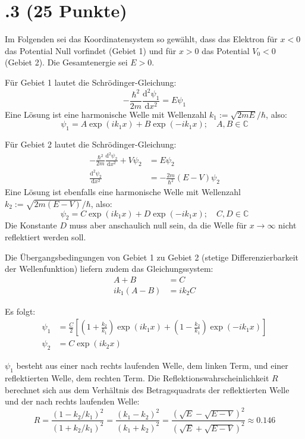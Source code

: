 \section*{\nr.3 \titthree (25 Punkte)}
Im Folgenden sei das Koordinatensystem so gewählt, dass das Elektron für $x<0$ das Potential Null vorfindet (Gebiet 1) und für $x>0$ das Potential $V_0<0$ (Gebiet 2). Die Gesamtenergie sei $E>0$.

Für Gebiet 1 lautet die Schrödinger-Gleichung:
\begin{equation}
-\frac{\hbar^2}{2m}\frac{\mathrm{d}^2 \psi_1}{\mathrm{d} x^2} = E \psi_1
\end{equation}
Eine Lösung ist eine harmonische Welle mit Wellenzahl $k_1 := \sqrt{2mE}/\hbar$, also:
\begin{equation}
\psi_1 = A\exp(ik_1 x) + B\exp(-ik_1 x); \quad A,B\in \mathbb{C}
\end{equation}

Für Gebiet 2 lautet die Schrödinger-Gleichung:
\begin{align}
-\frac{\hbar^2}{2m}\frac{\mathrm{d}^2 \psi_2}{\mathrm{d} x^2} +V\psi_2 &= E \psi_2\\
\frac{\mathrm{d}^2\psi_2}{\mathrm{d}x^2} &= -\frac{2m}{\hbar^2}(E-V) \psi_2
\end{align}
Eine Lösung ist ebenfalls eine harmonische Welle mit Wellenzahl $k_2 := \sqrt{2m(E-V)}/\hbar$, also:
\begin{equation}
\psi_2 = C\exp(ik_1 x) + D\exp(-ik_1 x); \quad C,D\in \mathbb{C}
\end{equation}
Die Konstante $D$ muss aber anschaulich null sein, da die Welle für $x\to \infty$ nicht reflektiert werden soll.

Die Übergangsbedingungen von Gebiet 1 zu Gebiet 2 (stetige Differenzierbarkeit der Wellenfunktion) liefern zudem das Gleichungssystem:
\begin{align}
A+B &= C \\
ik_1 (A-B) &= ik_2 C
\end{align}

Es folgt:
\begin{align}
\psi_1 &= \frac{C}{2} \left[ \left(1 + \frac{k_2}{k_1} \right)\exp(ik_1x) + \left(1 - \frac{k_2}{k_1} \right)\exp(-ik_1x)  \right] \\
\psi_2&= C \exp(ik_2x)
\end{align}

$\psi_1$ besteht aus einer nach rechts laufenden Welle, dem linken Term, und einer reflektierten Welle, dem rechten Term. Die Reflektionswahrscheinlichkeit $R$ berechnet sich aus dem Verhältnis des Betragsquadrats der reflektierten Welle und der nach rechts laufenden Welle:
\begin{equation}
R = \frac{(1-k_2/k_1)^2}{(1+k_2/k_1)^2} = \frac{(k_1-k_2)^2}{(k_1+k_2)^2} = \frac{(\sqrt{E}-\sqrt{E-V})^2}{(\sqrt{E}+\sqrt{E-V})^2} \approx \num{0.146}
\end{equation}